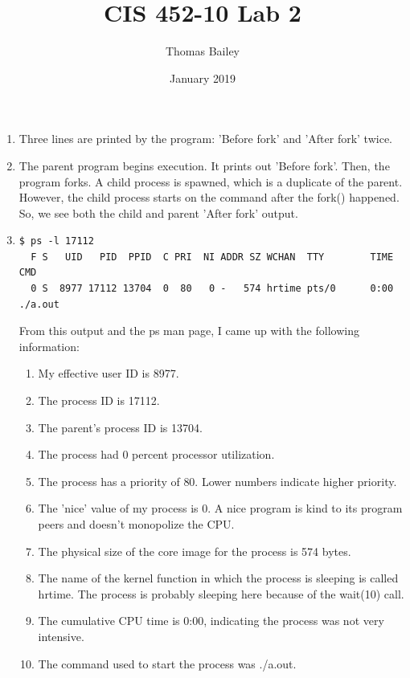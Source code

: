 \documentclass{article}
\title{CIS 452-10 Lab 2}
\author{Thomas Bailey}
\date{January 2019}
\begin{document}
\maketitle

\begin{enumerate}
    \item Three lines are printed by the program: 'Before fork' and 'After fork' twice.
    
    \item The parent program begins execution. It prints out 'Before fork'. Then, the program forks. A child process is spawned, which is a duplicate of the parent. However, the child process starts on the command after the fork() happened. So, we see both the child and parent 'After fork' output.
    
    \item
    \begin{verbatim}
$ ps -l 17112
  F S   UID   PID  PPID  C PRI  NI ADDR SZ WCHAN  TTY        TIME CMD
  0 S  8977 17112 13704  0  80   0 -   574 hrtime pts/0      0:00 ./a.out
    \end{verbatim}

    From this output and the ps man page, I came up with the following information:
    \begin{enumerate}
        \item My effective user ID is 8977.
        \item The process ID is 17112.
        \item The parent's process ID is 13704.
        \item The process had 0 percent processor utilization.
        \item The process has a priority of 80. Lower numbers indicate higher priority.
        \item The 'nice' value of my process is 0. A nice program is kind to its program peers and doesn't monopolize the CPU.
        \item The physical size of the core image for the process is 574 bytes.
        \item The name of the kernel function in which the process is sleeping is called hrtime. The process is probably sleeping here because of the wait(10) call.
        \item The cumulative CPU time is 0:00, indicating the process was not very intensive.
        \item The command used to start the process was ./a.out.
    \end{enumerate}
    

\end{enumerate}
\end{document}
